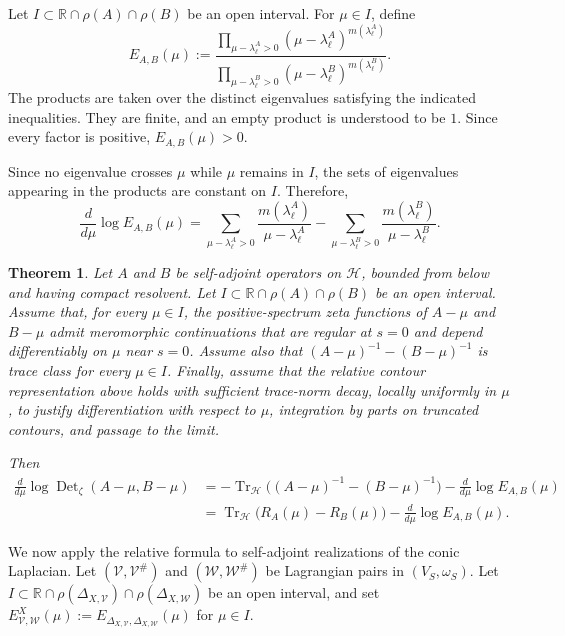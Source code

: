 \documentclass[12pt]{amsart}
\theoremstyle{plain}
\newtheorem{thm}{Theorem}[section]
\theoremstyle{definition}
\theoremstyle{remark}
\numberwithin{equation}{section} \numberwithin{figure}{section}
\newcommand{\mb}[1]{\mathbb{#1}} %
\begin{document}
Let \(I\subset\mathbb R\cap\rho(A)\cap\rho(B)\) be an open interval.
For \(\mu\in I\), define
\[
E_{A,B}(\mu)
:=
\frac{
\displaystyle
\prod_{\mu-\lambda_\ell^A>0}
(\mu-\lambda_\ell^A)^{m(\lambda_\ell^A)}
}{
\displaystyle
\prod_{\mu-\lambda_\ell^B>0}
(\mu-\lambda_\ell^B)^{m(\lambda_\ell^B)}
}.
\]
The products are taken over the distinct eigenvalues satisfying the
indicated inequalities. They are finite, and an empty product is
understood to be \(1\). Since every factor is positive,
\(E_{A,B}(\mu)>0\).

Since no eigenvalue crosses \(\mu\) while \(\mu\) remains in \(I\),
the sets of eigenvalues appearing in the products are constant on
\(I\). Therefore,
\[
\frac{d}{d\mu}\log E_{A,B}(\mu)
=
\sum_{\mu-\lambda_\ell^A>0}
\frac{m(\lambda_\ell^A)}{\mu-\lambda_\ell^A}
-
\sum_{\mu-\lambda_\ell^B>0}
\frac{m(\lambda_\ell^B)}{\mu-\lambda_\ell^B}.
\]
\begin{thm}\label{thm:log-derivative-relative-zeta-determinant}
Let \(A\) and \(B\) be self-adjoint operators on \(\mathcal H\),
bounded from below and having compact resolvent. Let
\(I\subset\mathbb R\cap\rho(A)\cap\rho(B)\) be an open interval.
Assume that, for every \(\mu\in I\), the positive-spectrum zeta
functions of \(A-\mu\) and \(B-\mu\) admit meromorphic
continuations that are regular at \(s=0\) and depend
differentiably on \(\mu\) near \(s=0\). Assume also that
\((A-\mu)^{-1}-(B-\mu)^{-1}\) is trace class for every
\(\mu\in I\). Finally, assume that the relative contour
representation above holds with sufficient trace-norm decay,
locally uniformly in \(\mu\), to justify differentiation with
respect to \(\mu\), integration by parts on truncated contours, and
passage to the limit.

Then
\[
\begin{aligned}
\frac{d}{d\mu}
\log\operatorname{Det}_{\zeta}(A-\mu,B-\mu)
&=
-\operatorname{Tr}_{\mathcal H}\bigl(
(A-\mu)^{-1}-(B-\mu)^{-1}
\bigr)
-
\frac{d}{d\mu}\log E_{A,B}(\mu) \\
&=
\operatorname{Tr}_{\mathcal H}\bigl(
R_A(\mu)-R_B(\mu)
\bigr)
-
\frac{d}{d\mu}\log E_{A,B}(\mu).
\end{aligned}
\]
\end{thm}

We now apply the relative formula to self-adjoint realizations of the
conic Laplacian.
Let \((\mathcal V,\mathcal V^\#)\) and
\((\mathcal W,\mathcal W^\#)\) be Lagrangian pairs in
\((V_S,\omega_S)\). Let
\(I\subset\mb R\cap
\rho(\Delta_{X,\mathcal V})
\cap\rho(\Delta_{X,\mathcal W})\)
be an open interval, and set
\(
E_{\mathcal V,\mathcal W}^{X}(\mu)
:=
E_{\Delta_{X,\mathcal V},\Delta_{X,\mathcal W}}(\mu)
\)
for \(\mu\in I\).
\end{document}
